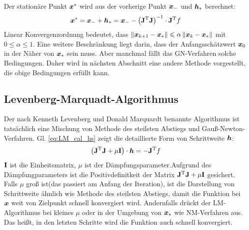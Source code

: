 Der stationäre Punkt $\boldsymbol x^{\ast}$ wird aus der vorherige Punkt $\boldsymbol x_{-}$ und $\boldsymbol h_{\ast}$ berechnet:
\begin{equation}
\boldsymbol x^{\ast} = \boldsymbol x_{-} + \boldsymbol h_{\ast} = \boldsymbol x_{-} - \left ( \mathbf{J}^\mathrm{T} \mathbf{J} \right )^\mathrm{-1} \cdot \mathbf{J}^\mathrm{T}f\label{eq:newton-xs}
\end{equation} 
Linear Konvergenzordnung bedeutet, dass $\left\|\boldsymbol x_{k+1} -\boldsymbol x_{\ast}\right\| \leqslant \alpha \left\|\boldsymbol x_{k}-\boldsymbol x_{\ast}\right\|$ mit $0 \leqslant \alpha \leqslant 1$. Eine weitere Beschränkung liegt darin, dass der Anfangsschätzwert $\boldsymbol x_{0}$ in der Näher von $\boldsymbol x_{\ast}$ sein muss. Aber manchmal fällt das GN-Verfahren solche Bedingungen. Daher wird in nächsten Abschnitt eine andere Methode vorgestellt, die obige Bedingungen erfüllt kann. 
\subsection{Levenberg-Marquadt-Algorithmus}
\label{Levenberg-Marquadt-Algorithmus}
Der nach Kenneth Levenberg und Donald Marquardt benannte Algorithmus ist tatsächlich eine Mischung von Methode des steilsten Abstiegs und Gauß-Newton-Verfahren. Gl. \ref{eq:LM_cal_hs} zeigt die detaillierte Form von Schrittweite $\boldsymbol h$\cite{madsen2004methods}\cite{von2015einfuhrung}:
\begin{equation}
\left ( \mathbf{J}^\mathrm{T} \mathbf{J} + \mu\mathbf{I}\right ) \cdot \boldsymbol h  = -\mathbf{J}^\mathrm{T}f
\label{eq:LM_cal_hs}
\end{equation}
$\mathbf{I}$ ist die Einheitsmatrix, $\mu$ ist der Dämpfungsparameter.Aufgrund des Dämpfungparameters ist die Positivdefinitkeit der Matrix $\mathbf{J}^\mathrm{T} \mathbf{J} + \mu\mathbf{I}$ gesichert. Falls $\mu$ groß ist(das passiert am Anfang der Iteration), ist die Darstellung von Schrittweite ähnlich wie Methode des steilsten Abstiegs, damit die Funktion bei $\boldsymbol x$ weit von Zielpunkt schnell konvergiert wird. Andernfalls drückt der LM-Algorithmus bei kleines $\mu$ oder in der Umgebung von $\boldsymbol x_{\ast}$ wie NM-Verfahren aus. Das heißt, in den letzten Schritte wird die Funktion auch schnell konvergiert.

